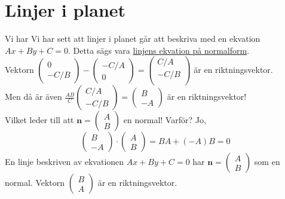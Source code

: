 \section{Linjer i planet}
Vi har 
Vi har sett att linjer i planet går att beskriva med en ekvation $Ax+By+C=0$.
Detta sägs vara \underline{linjens ekvation på normalform}.\\
Vektorn $\begin{pmatrix}0\\-C/B\end{pmatrix}-\begin{pmatrix}-C/A\\0\end{pmatrix}=\begin{pmatrix}C/A\\-C/B\\\end{pmatrix}$ är en riktningsvektor.\\
Men då är även $\frac{AB}{C}\begin{pmatrix}C/A\\-C/B\end{pmatrix}=\begin{pmatrix}B\\-A\end{pmatrix}$ är en riktningsvektor!\\
Vilket leder till att $\bm{n}=\begin{pmatrix}A\\B\end{pmatrix}$ en normal!
Varför? Jo, 
\begin{equation*}
    \begin{pmatrix}B\\-A\end{pmatrix}\cdot \begin{pmatrix}A\\B\end{pmatrix}=BA+(-A)B=0
\end{equation*}
En linje beskriven av ekvationen $Ax+By+C=0$ har $\bm{n}=\begin{pmatrix}A\\B\end{pmatrix}$ som en normal.
Vektorn $\begin{pmatrix}B\\A\end{pmatrix}$ är en riktningsvektor.


